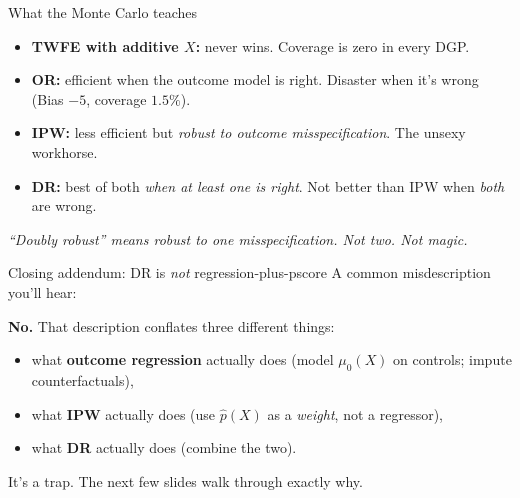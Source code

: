 \documentclass[aspectratio=169,11pt]{beamer}
\begin{document}
\begin{frame}{What the Monte Carlo teaches}
\vspace{0.4em}
\begin{itemize}\small
  \item \textbf{TWFE with additive $X$:} never wins. \;Coverage is zero in every DGP. 
  \item \textbf{OR:} efficient when the outcome model is right. Disaster when it's wrong (Bias $-5$, coverage $1.5\%$).
  \item \textbf{IPW:} less efficient but \textit{robust to outcome misspecification}. The unsexy workhorse.
  \item \textbf{DR:} best of both \textit{when at least one is right}. \;Not better than IPW when \textit{both} are wrong.
\end{itemize}
\vspace{0.4em}
\begin{center}
\small\color{warmgray}\itshape
``Doubly robust'' means \textit{robust to one misspecification.} \;Not two. \;Not magic.
\end{center}
\end{frame}




\begin{frame}{Closing addendum: DR is \textit{not} regression-plus-pscore}
\footnotesize
A common misdescription you'll hear:
\vspace{0.3em}

\vspace{0.6em}
\textbf{No.} \;That description conflates three different things:
\begin{itemize}\setlength\itemsep{2pt}
  \item what \textbf{outcome regression} actually does (model $\mu_0(X)$ on controls; impute counterfactuals),
  \item what \textbf{IPW} actually does (use $\widehat{p}(X)$ as a \textit{weight}, not a regressor),
  \item what \textbf{DR} actually does (combine the two).
\end{itemize}

\vspace{0.4em}
 \;It's a trap. \;The next few slides walk through exactly why.
\end{frame}
\end{document}
